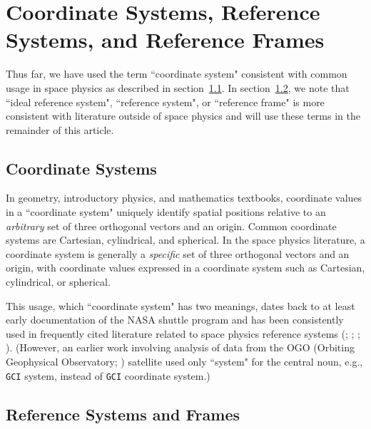 \documentclass[draft]{agujournal2019}
\begin{document}
\section{Coordinate Systems, Reference Systems, and Reference Frames}
\label{sect:terminology}

Thus far, we have used the term ``coordinate system" consistent with common usage in space physics as described in section~\ref{sect:coordsystems}. In section~\ref{sect:refsystems}, we note that ``ideal reference system", ``reference system", or ``reference frame" is more consistent with literature outside of space physics and will use these terms in the remainder of this article.

\subsection{Coordinate Systems}
\label{sect:coordsystems}

In geometry, introductory physics, and mathematics textbooks, coordinate values in a ``coordinate system" uniquely identify spatial positions relative to an {\it arbitrary} set of three orthogonal vectors and an origin. Common coordinate systems are Cartesian, cylindrical, and spherical. In the space physics literature, a coordinate system is generally  a {\it specific} set of three orthogonal vectors and an origin, with coordinate values expressed in a coordinate system such as Cartesian, cylindrical, or spherical.

This usage,  which ``coordinate system" has two meanings, dates back to at least early documentation of the NASA shuttle program \cite{Davis1974} and has been consistently used in frequently cited literature related to space physics reference systems (; ; ; ). (However, an earlier work involving analysis of data from the OGO (Orbiting Geophysical Observatory; ) satellite used only ``system" for the central noun, e.g., \texttt{GCI} system, instead of \texttt{GCI} coordinate system.)


\subsection{Reference Systems and Frames}
\label{sect:refsystems}
\end{document}
